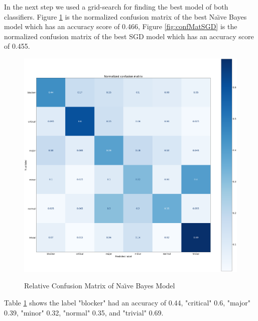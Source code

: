 \documentclass[sigconf,screen]{acmart}
\begin{document}
In the next step we used a grid-search for finding the best model of both classifiers. Figure \ref{fig:confMatNB} is the normalized confusion matrix of the best Na{\"\i}ve Bayes model which has an accuracy score of 0.466,  Figure \ref{fig:confMatSGD} is the normalized confusion matrix of the best SGD model which has an accuracy score of 0.455.

\begin{figure}[h]
	\caption{Relative Confusion Matrix of Na{\"\i}ve Bayes Model}
	\centering
	\includegraphics[scale=0.1]{norm_conf_matrix_nb}
	\label{fig:confMatNB}	
\end{figure}

Table \ref{fig:confMatNB} shows the label "blocker" had an accuracy of 0.44, "critical"  0.6, "major" 0.39, "minor" 0.32, "normal" 0.35, and "trivial" 0.69.
\end{document}
